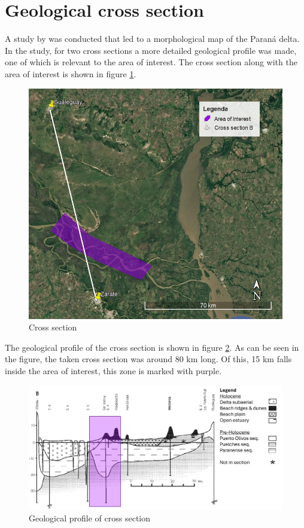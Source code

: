 \section{Geological cross section}
A study by \citeauthor{joseluiscavallottoEvolucionCambiosAmbientales2005} was conducted that led to a morphological map of the Paraná delta. In the study, for two cross sections a more detailed geological profile was made, one of which is relevant to the area of interest. The cross section along with the area of interest is shown in figure \ref{fig:crosssectiongeo}.

\begin{figure}[H]
    \centering
    \includegraphics[width=0.75\linewidth]{figures/ch9/CrossSectionB.png}
    \caption{Cross section}
    \label{fig:crosssectiongeo}
\end{figure}

The geological profile of the cross section is shown in figure \ref{fig:geolprofile}. As can be seen in the figure, the taken cross section was around 80 km long. Of this, 15 km falls inside the area of interest, this zone is marked with purple.

\begin{figure}[H]
    \centering
    \includegraphics[width=1\linewidth]{figures/ch9/CrossSectionBResults.png}
    \caption{Geological profile of cross section \autocite{joseluiscavallottoEvolucionCambiosAmbientales2005}}
    \label{fig:geolprofile}
\end{figure}

